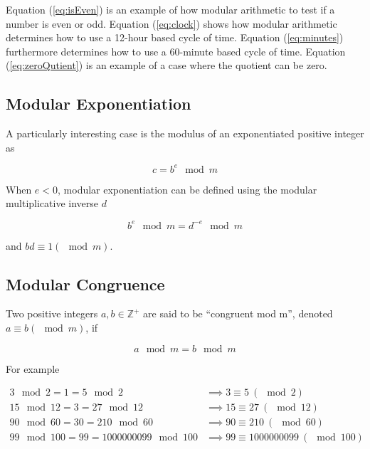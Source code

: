 \documentclass{article}
\renewcommand{\_}{\ifincsname_\else\legacyunderscore\fi}
\begin{document}
        Equation (\ref{eq:isEven}) is an example of how modular arithmetic to test if a number is even or odd.  Equation (\ref{eq:clock}) shows how modular arithmetic determines how to use a 12-hour based cycle of time.  Equation (\ref{eq:minutes}) furthermore determines how to use a 60-minute based cycle of time.  Equation (\ref{eq:zeroQutient}) is an example of a case where the quotient can be zero.

    \subsection*{Modular Exponentiation}

        A particularly interesting case is the modulus of an exponentiated positive integer as

        \begin{equation}
            c = b^e \mod m
        \end{equation}

        When $e < 0$, modular exponentiation can be defined using the modular multiplicative inverse $d$

        \begin{equation}
            b^e \mod m = d^{-e} \mod m
        \end{equation}

        and $b d \equiv 1 (\mod m)$.

    \subsection*{Modular Congruence}    

        Two positive integers $a, b \in \mathbb{Z}^+$ are said to be ``congruent mod m'', denoted $a \equiv b (\mod m)$, if 

        \begin{equation}
            a \mod m = b \mod m
        \end{equation}

        For example

        \begin{align}
            \label{eq:isEven}      3 \mod 2 = 1 = 5 \mod 2 &\implies 3 \equiv 5 \ (\mod 2) \\
            \label{eq:clock}       15 \mod 12 = 3 = 27 \mod 12 &\implies 15 \equiv 27 \ (\mod 12) \\
            \label{eq:minutes}     90 \mod 60 = 30 = 210 \mod 60 &\implies 90 \equiv 210 \ (\mod 60) \\
            \label{eq:zeroQutient} 99 \mod 100 = 99 = 1000000099 \mod 100 &\implies 99 \equiv 1000000099 \ (\mod 100)
        \end{align}
\end{document}

